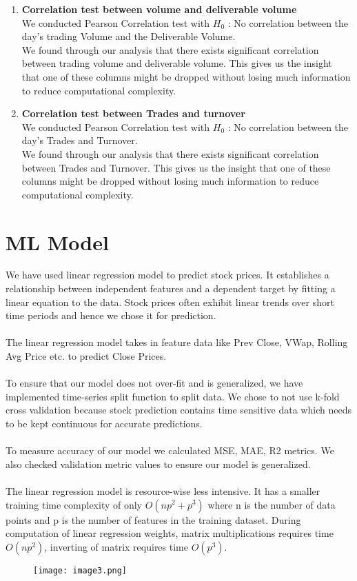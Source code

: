 \documentclass[conference]{IEEEtran}
\begin{document}
\begin{enumerate}
\item \textbf{Correlation test between volume and deliverable volume}\\
    We conducted Pearson Correlation test with \(H_{0}\) : No correlation between the day's trading Volume and the Deliverable Volume.
    \\
    We found through our analysis that there exists significant correlation between trading volume and deliverable volume. This gives us the insight that one of these columns might be dropped without losing much information to reduce computational complexity.
\item \textbf{Correlation test between Trades and turnover}\\
    We conducted Pearson Correlation test with \(H_{0}\) : No correlation between the day's Trades and Turnover.
    \\
    We found through our analysis that there exists significant correlation between Trades and Turnover. This gives us the insight that one of these columns might be dropped without losing much information to reduce computational complexity.
\end{enumerate}

\section{ML Model}
We have used linear regression model to predict stock prices. It establishes a relationship between independent features and a dependent target by fitting a linear equation to the data. Stock prices often exhibit linear trends over short time periods and hence we chose it for prediction.\\\\
The linear regression model takes in feature data like Prev Close, VWap, Rolling Avg Price etc. to predict Close Prices.\\\\
To ensure that our model does not over-fit and is generalized, we have implemented time-series split function to split data. We chose to not use k-fold cross validation because stock prediction contains time sensitive data which needs to be kept continuous for accurate predictions.\\\\
To measure accuracy of our model we calculated MSE, MAE, R2 metrics. We also checked validation metric values to ensure our model is generalized.\\\\
The linear regression model is resource-wise less intensive. It has a smaller training time complexity of only $O(np^2 + p^3)$ where n is the number of data points and p is the number of features in the training dataset. During computation of linear regression weights, matrix multiplications requires  time $O(np^2)$, inverting of matrix requires time $O(p^3)$.
\vspace{-0.3cm}
\begin{figure}[H]
\centering
\texttt{[image: image3.png]}
\label{fig:distribution_categories}
\end{figure}
\vspace{-0.5cm}
\end{document}
